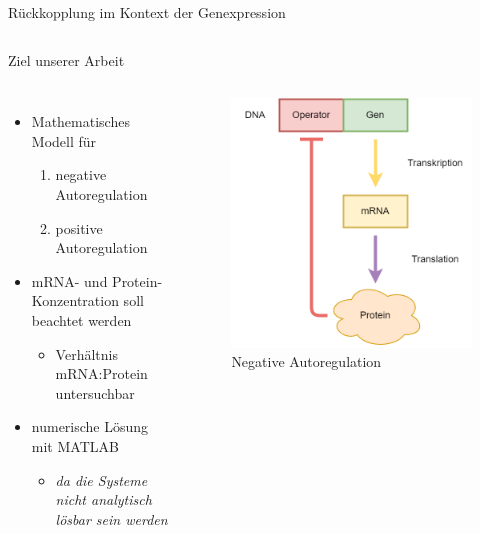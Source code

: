 \documentclass[11pt,aspectratio=169,reqno]{beamer}
\begin{document}
\begin{frame}{Rückkopplung im Kontext der Genexpression}
\begin{columns}
    
\end{columns}
\end{frame}

\begin{frame}{Ziel unserer Arbeit}
\begin{columns}

    \begin{itemize}
        \item Mathematisches Modell für
        \begin{enumerate}
            \item negative Autoregulation
            \item positive Autoregulation
        \end{enumerate}
        \item mRNA- und Protein-Konzentration soll beachtet werden
        \begin{itemize}
            \item Verhältnis mRNA:Protein untersuchbar
        \end{itemize}
        \item numerische Lösung mit MATLAB
        \begin{itemize}
            \item \emph{da die Systeme nicht analytisch lösbar sein werden}
        \end{itemize}
    \end{itemize}
    
    \begin{figure}
        \centering
        \includegraphics[width=.7\textwidth]{images/repression.png}
        \caption{\tiny Negative Autoregulation}
    \end{figure}
\end{columns}
\end{frame}
\end{document}

